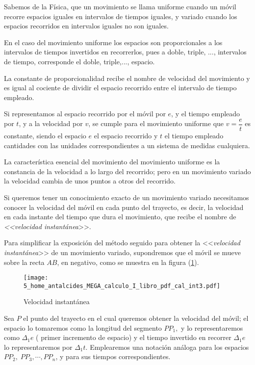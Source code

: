 \begin{solucion}

Sabemos de la Física, que un movimiento se llama uniforme cuando un
móvil recorre espacios iguales en intervalos de tiempos iguales, y
variado cuando los espacios recorridos en intervalos iguales no son
iguales. 

En el caso del movimiento uniforme los espacios son proporcionales
a los intervalos de tiempos invertidos en recorrerlos, pues a doble,
triple, ..., intervalos de tiempo, corresponde el doble, triple,...,
espacio.

La constante de proporcionalidad recibe el nombre de velocidad del
movimiento y es igual al cociente de dividir el espacio recorrido
entre el intervalo de tiempo empleado.

Si representamos al espacio recorrido por el móvil por $e$, y el
tiempo empleado por $t$, y a la velocidad por $v$, se cumple para
el movimiento uniforme que $v=\dfrac{e}{t}$ es constante, siendo
el espacio $e$ el espacio recorrido y $t$ el tiempo empleado cantidades
con las unidades correspondientes a un sistema de medidas cualquiera.

La característica esencial del movimiento del movimiento uniforme
es la constancia de la velocidad a lo largo del recorrido; pero en
un movimiento variado la velocidad cambia de unos puntos a otros del
recorrido.

Si queremos tener un conocimiento exacto de un movimiento variado
necesitamos conocer la velocidad del móvil en cada punto del trayecto,
es decir, la velocidad en cada instante del tiempo que dura el movimiento,
que recibe el nombre de \textsl{<<velocidad instantánea}>>.

Para simplificar la exposición del método seguido para obtener la
<<\textsl{velocidad instantánea}>> de un movimiento variado, supondremos
que el móvil se mueve sobre la recta $AB$, en negativo, como se muestra
en la figura (\ref{fig:fig3}).

\begin{figure}[H]
\centering\texttt{[image: 5\_home\_antalcides\_MEGA\_calculo\_I\_libro\_pdf\_cal\_int3.pdf]}\caption{Velocidad instantánea}\label{fig:fig3}
\end{figure}

Sea $P$ el punto del trayecto en el cual queremos obtener la velocidad
del móvil; el espacio lo tomaremos como la longitud del segmento $PP_{1},$
y lo representaremos como $\Delta_{1}e$ ( primer incremento de espacio)
y el tiempo invertido en recorrer $\Delta_{1}e$ lo representaremos
por $\Delta_{1}t$. Emplearemos una notación análoga para los espacios
$PP_{2},\;PP_{3},\cdots,PP_{n}$, y para sus tiempos correspondientes. 


\end{solucion}

